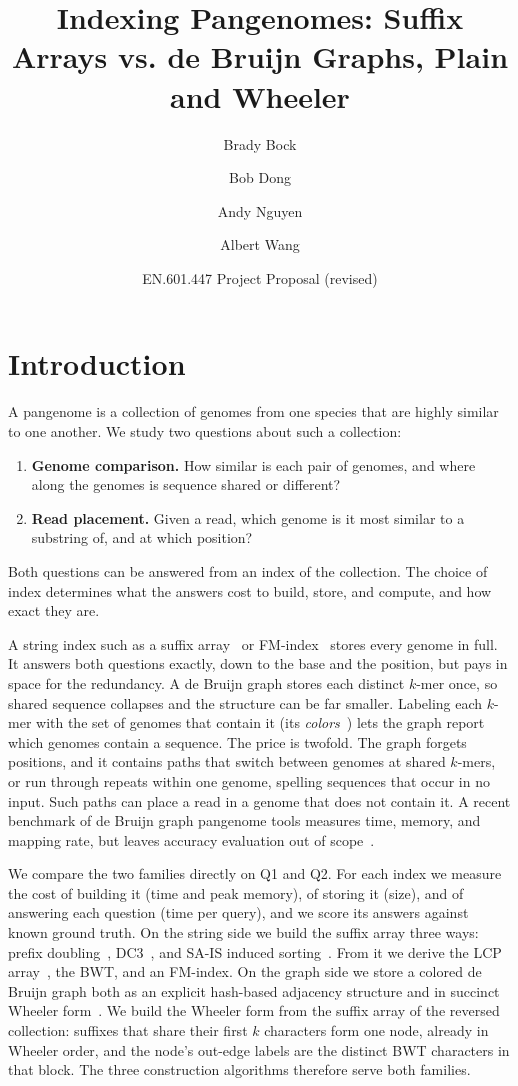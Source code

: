 \documentclass[a4paper,11pt]{article}
\title{Indexing Pangenomes: Suffix Arrays vs. de Bruijn Graphs, Plain and Wheeler}
\author{Brady Bock \and Bob Dong \and Andy Nguyen \and Albert Wang}
\date{EN.601.447 Project Proposal (revised)}
\theoremstyle{definition}
\begin{document}
\maketitle
\section{Introduction}
A pangenome is a collection of genomes from one species that are highly similar to one another. We study two questions about such a collection:
\begin{enumerate}[label=\textbf{Q\arabic*.}, leftmargin=2.6em, itemsep=1pt]
\item \textbf{Genome comparison.} How similar is each pair of genomes, and where along the genomes is sequence shared or different?
\item \textbf{Read placement.} Given a read, which genome is it most similar to a substring of, and at which position?
\end{enumerate}
Both questions can be answered from an index of the collection. The choice of index determines what the answers cost to build, store, and compute, and how exact they are.

A string index such as a suffix array~\cite{doi:10.1137/0222058} or FM-index~\cite{ferragina2000opportunistic} stores every genome in full. It answers both questions exactly, down to the base and the position, but pays in space for the redundancy. A de Bruijn graph stores each distinct $k$-mer once, so shared sequence collapses and the structure can be far smaller. Labeling each $k$-mer with the set of genomes that contain it (its \emph{colors}~\cite{iqbal2012colored}) lets the graph report which genomes contain a sequence. The price is twofold. The graph forgets positions, and it contains paths that switch between genomes at shared $k$-mers, or run through repeats within one genome, spelling sequences that occur in no input. Such paths can place a read in a genome that does not contain it. A recent benchmark of de Bruijn graph pangenome tools measures time, memory, and mapping rate, but leaves accuracy evaluation out of scope~\cite{bingol2026debruijn}.

We compare the two families directly on Q1 and Q2. For each index we measure the cost of building it (time and peak memory), of storing it (size), and of answering each question (time per query), and we score its answers against known ground truth. On the string side we build the suffix array three ways: prefix doubling~\cite{doi:10.1137/0222058}, DC3~\cite{10.1007/3-540-45061-0_73}, and SA-IS induced sorting~\cite{5582081}. From it we derive the LCP array~\cite{kasai2001linear}, the BWT, and an FM-index. On the graph side we store a colored de Bruijn graph both as an explicit hash-based adjacency structure and in succinct Wheeler form~\cite{GAGIE201767,bowe2012succinct}. We build the Wheeler form from the suffix array of the reversed collection: suffixes that share their first $k$ characters form one node, already in Wheeler order, and the node's out-edge labels are the distinct BWT characters in that block. The three construction algorithms therefore serve both families.
\end{document}
